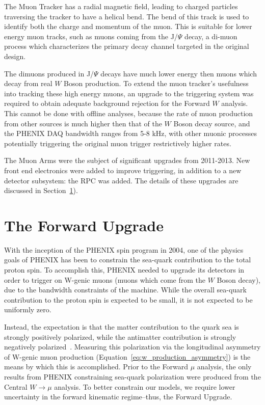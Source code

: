 The Muon Tracker has a radial magnetic field, leading to charged particles
traversing the tracker to have a helical bend. The bend of this track is used to
identify both the charge and momentum of the muon. This is suitable for lower
energy muon tracks, such as muons coming from the J/$\Psi$ decay, a di-muon
process which characterizes the primary decay channel targeted in the original
design.

The dimuons produced in J/$\Psi$ decays have much lower energy then muons which
decay from real $W$ Boson production. To extend the muon tracker's usefulness
into tracking these high energy muons, an upgrade to the triggering system was
required to obtain adequate background rejection for the Forward $W$ analysis.
This cannot be done with offline analyses, because the rate of muon production
from other sources is much higher then that of the $W$ Boson decay source, and
the PHENIX DAQ bandwidth ranges from 5-8 kHz, with other muonic processes
potentially triggering the original muon trigger restrictively higher rates.

The Muon Arms were the subject of significant upgrades from 2011-2013.  New
front end electronics were added to improve triggering, in addition to a new
detector subsystem: the RPC was added. The details of these upgrades are
discussed in Section~\ref{sec:forward_upgrade}).

\clearpage
\section{The Forward Upgrade} 
\label{sec:forward_upgrade}

With the inception of the PHENIX spin program in 2004, one of the physics goals
of PHENIX has been to constrain the sea-quark contribution to the total proton
spin. To accomplish this, PHENIX needed to upgrade its detectors in order to
trigger on W-genic muons (muons which come from the $W$ Boson decay), due to the
bandwidth constraints of the machine. While the overall sea-quark contribution
to the proton spin is expected to be small, it is not expected to be uniformly
zero. 

Instead, the expectation is that the matter contribution to the quark sea is
strongly positively polarized, while the antimatter contribution is strongly
negatively polarized~\cite{Aidala2005}.  Measuring this polarization via the
longitudinal asymmetry of W-genic muon production
(Equation~\ref{eq:w_production_asymmetry}) is the means by which this is
accomplished. Prior to the Forward $\mu$ analysis, the only results from
PHENIX constraining sea-quark polarization were produced from the Central
$W\rightarrow\mu$ analysis. To better constrain our models, we require lower
uncertainty in the forward kinematic regime--thus, the Forward Upgrade.

